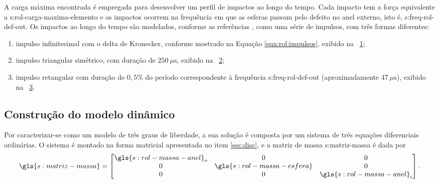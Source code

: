 \documentclass[12pt,oneside,english,brazil,lmodern,siglas,simbolos,cite=num]{ucsmonograph}
\begin{document}
	A carga máxima encontrada é empregada para desenvolver um perfil de impactos ao longo do tempo.
	Cada impacto tem a força equivalente a \gls{s:rol-carga-maxima-elemento} e os impactos ocorrem na frequência em que as esferas passam pelo defeito no anel externo, isto é, \gls{s:freq-rol-def-out}.
	Os impactos ao longo do tempo são modelados, conforme as referências \cite{mcfadden:1984,tandon:1997}, como uma série de impulsos, com três formas diferentes:
	\begin{enumerate}
		\item impulso infinitesimal com o delta de Kronecker, conforme mostrado na Equação \ref{eqn:rol:impulsos}, exibido na \figurename\ \ref{fig:modelo-imp-kron};
		\item impulso triangular simétrico, com duração de $250\ \mu\text{s}$, exibido na \figurename\ \ref{fig:modelo-imp-tri};
		\item impulso retangular com duração de $0,5\%$ do período correspondente à frequência \gls{s:freq-rol-def-out} (aproximadamente $47\ \mu\text{s}$), exibido na \figurename\ \ref{fig:modelo-imp-rect}.
	\end{enumerate}
	
	\begin{figure}[b]
		\label{fig:modelo-imp-kron}
	\end{figure}
	
	\begin{figure}[h]
		\label{fig:modelo-imp-tri}
	\end{figure}

	\begin{figure}[h]
		\label{fig:modelo-imp-rect}
	\end{figure}

	\subsection{Construção do modelo dinâmico}
	Por caracterizar-se como um modelo de três graus de liberdade, a sua solução é composta por um sistema de três equações diferenciais ordinárias.
	O sistema é montado na forma matricial apresentada no item \ref{sec:disc}, e a matriz de massa \gls{s:matriz-massa} é dada por
	\begin{equation*}
		\gls{s:matriz-massa} =
	\begin{bmatrix}
		\gls{s:rol-massa-anel}_o	&	0	&	0\\
		0	&	\gls{s:rol-massa-esfera}	&	0\\
		0	&	0	&	\gls{s:rol-massa-anel}_i
	\end{bmatrix}.
	\end{equation*}
	
\end{document}
